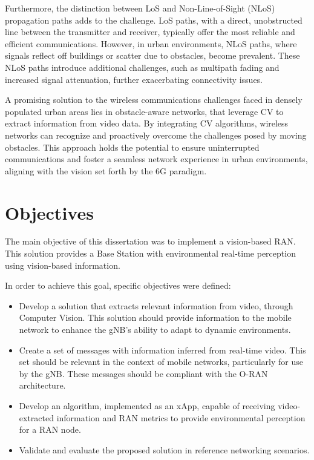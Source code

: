Furthermore, the distinction between LoS and Non-Line-of-Sight (NLoS) propagation paths adds to the challenge.
LoS paths, with a direct, unobstructed line between the transmitter and receiver, typically offer the most reliable and efficient communications.
However, in urban environments, NLoS paths, where signals reflect off buildings or scatter due to obstacles, become prevalent.
These NLoS paths introduce additional challenges, such as multipath fading and increased signal attenuation, further exacerbating connectivity issues.

A promising solution to the wireless communications challenges faced in densely populated urban areas lies in obstacle-aware networks, that leverage CV to extract information from video data.
By integrating CV algorithms, wireless networks can recognize and proactively overcome the challenges posed by moving obstacles.
This approach holds the potential to ensure uninterrupted communications and foster a seamless network experience in urban environments, aligning with the vision set forth by the 6G paradigm.

\section{Objectives}\label{sec:objectives}

The main objective of this dissertation was to implement a vision-based RAN. This solution provides a Base Station with environmental real-time perception using vision-based information.

In order to achieve this goal, specific objectives were defined:

    \begin{itemize}
    
    \item Develop a solution that extracts relevant information from video, through Computer Vision.
    This solution should provide information to the mobile network to enhance the gNB's ability to adapt to dynamic environments.
    
    \item Create a set of messages with information inferred from real-time video.
    This set should be relevant in the context of mobile networks, particularly for use by the gNB\@.
    These messages should be compliant with the O-RAN architecture.
    
    \item Develop an algorithm, implemented as an xApp, capable of receiving video-extracted information and RAN metrics to provide environmental perception for a RAN node.
      
    \item Validate and evaluate the proposed solution in reference networking scenarios.
    
    \end{itemize}

